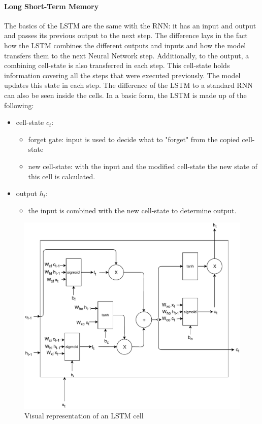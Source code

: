 \paragraph{Long Short-Term Memory}\label{LSTM Theory}
The basics of the LSTM are the same with the RNN: it has an input and output and passes its previous output to the next step.
The difference lays in the fact how the LSTM combines the different outputs and inputs and how the model transfers them to the next Neural Network step.
Additionally, to the output, a combining cell-state is also transferred in each step.
This cell-state holds information covering all the steps that were executed previously.
The model updates this state in each step.
The difference of the LSTM to a standard RNN can also be seen inside the cells.
In a basic form, the LSTM is made up of the following:
\begin{itemize}
	\item cell-state ${c}_{t}$:
	\begin{itemize}
		\item forget gate: input is used to decide what to "forget" from the copied cell-state
		\item new cell-state: with the input and the modified cell-state the new state of this cell is calculated.
	\end{itemize}                        
	\item output ${h}_{t}$:
	\begin{itemize}
		\item the input is combined with the new cell-state to determine output. 
	\end{itemize}                        
\end{itemize}
\begin{figure}
	\centering
	\includegraphics[width=.8\linewidth]{"Pictures/LSTM Cell"}
	\caption{Visual representation of an LSTM cell \cite{DBLP:journals/corr/Graves13}}
	\label{fig:lstm}
\end{figure}

